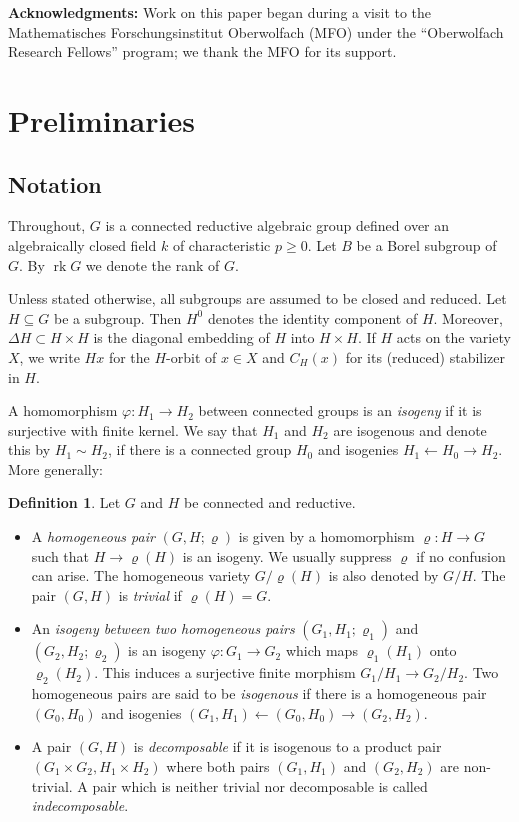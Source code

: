 \documentclass[12pt]{amsart}
\renewcommand{\phi}{\varphi}
\renewcommand{\rho}{\varrho}
\newcommand\rk{\operatorname{rk}}
\numberwithin{equation}{section}
\theoremstyle{definition}
\newtheorem{definition}[definition]{Definition}
\begin{document}

\textbf{Acknowledgments:} Work on this paper began during a visit to the Mathematisches Forschungsinstitut Oberwolfach (MFO) under the ``Oberwolfach Research Fellows'' program; we thank the MFO for its support.

\section{Preliminaries}
\label{sec:basics}

\subsection{Notation}
Throughout, $G$ is a connected reductive algebraic group defined over
an algebraically closed field $k$ of characteristic $p\geqslant  0$. Let $B$ be a
Borel subgroup of $G$. By $\rk G$ we denote the rank of $G$.

Unless stated otherwise, all subgroups are assumed to be closed
and reduced.  Let $H\subseteq G$ be a subgroup. Then $H^0$ denotes the identity component of $H$. Moreover, $\Delta H \subset H \times H$ is the diagonal embedding of $H$ into $H \times H$. If $H$ acts
on the variety $X$, we write  $Hx$ for the $H$-orbit of $x\in X$  and $C_H(x)$ for its (reduced) stabilizer in $H$.

A homomorphism $\phi:H_1\to H_2$ between connected groups is an
\emph{isogeny} if it is surjective with finite kernel. We say that
$H_1$ and $H_2$ are isogenous and denote this by $H_1 \sim H_2$, if
there is a connected group $H_0$ and isogenies
$H_1\leftarrow H_0\to H_2$. More generally:

\begin{definition}
  \label{def:pairs}
  Let $G$ and $H$ be connected and reductive.
  \begin{itemize}
  	\item [(i)] A \emph{homogeneous pair} $(G,H;\rho)$ is given by a homomorphism $\rho:H\to G$ such that $H\to\rho(H)$ is an isogeny. We usually suppress $\rho$ if no
  	confusion can arise. The homogeneous variety $G/\rho(H)$ is also
  	denoted by $G/H$. The pair $(G,H)$ is \emph{trivial} if
  	$\rho(H)=G$.
  	\item [(ii)] An \emph{isogeny between two homogeneous pairs}
  	$(G_1,H_1;\rho_1)$ and $(G_2,H_2;\rho_2)$ is an isogeny
  	$\phi:G_1\to G_2$ which maps $\rho_1(H_1)$ onto $\rho_2(H_2)$. This
  	induces a surjective finite morphism $G_1/H_1\to G_2/H_2$. Two
  	homogeneous pairs are said to be \emph{isogenous} if there is a
  	homogeneous pair $(G_0,H_0)$ and isogenies
  	$(G_1,H_1)\leftarrow(G_0,H_0)\to(G_2,H_2)$.
  	\item [(iii)] A pair $(G,H)$ is \emph{decomposable} if it is isogenous
  	to a product pair $(G_1\times G_2,H_1\times H_2)$ where both pairs
  	$(G_1,H_1)$ and $(G_2,H_2)$ are non-trivial. A pair which is neither
  	trivial nor decomposable is called \emph{indecomposable}.
  \end{itemize}
\end{definition}
\end{document}
